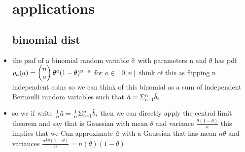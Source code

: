 \documentclass{article}
\begin{document}
\begin{itemize}
\section{applications}
\subsection{binomial dist }
\item the pmf of a binomial random variable $\Tilde{a}$ with parameters n and $\theta$ has pdf $p_{\Tilde{a}}(a)=\begin{pmatrix}n\\a\end{pmatrix}\theta^{a}(1-\theta)^{n-a}$ for $a\in[0,n]$ think of this as flipping n independent coins
\itme so we can think of this binomial as a sum of independent Bernoulli random variables such that $\Tilde{a}=\Sigma_{i=1}^{n}\Tilde{b}_i$
\item so we if write $\frac{1}{n}\Tilde{a}=\frac{1}{n}\Sigma_{i=1}^{n}\Tilde{b}_i$ then we can directly apply the central limit theorem and say that is Gaussian with mean $\theta$ and variance $\frac{\theta(1-\theta)}{n}$ this implies that we Can approximate $\Tilde{a}$ with a Gaussian that has mean $n\theta$ and variances $\frac{n^2\theta(1-\theta)}{n}=n(\theta)(1-\theta)$

\end{itemize}
\end{document}
